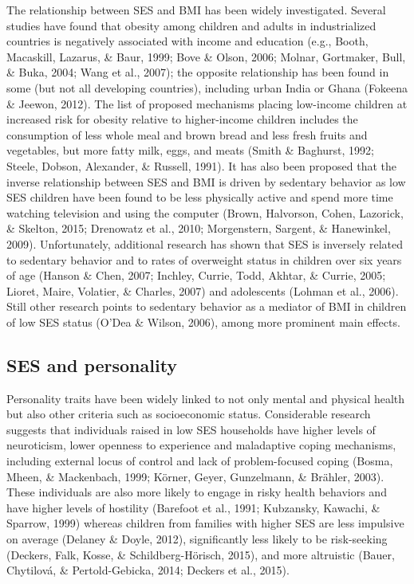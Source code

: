 \documentclass[man]{apa6}
\begin{document}
The relationship between SES and BMI has been widely investigated. Several studies have found that obesity among children and adults in industrialized countries is negatively associated with income and education (e.g., Booth, Macaskill, Lazarus, \& Baur, 1999; Bove \& Olson, 2006; Molnar, Gortmaker, Bull, \& Buka, 2004; Wang et al., 2007); the opposite relationship has been found in some (but not all developing countries), including urban India or Ghana (Fokeena \& Jeewon, 2012). The list of proposed mechanisms placing low-income children at increased risk for obesity relative to higher-income children includes the consumption of less whole meal and brown bread and less fresh fruits and vegetables, but more fatty milk, eggs, and meats (Smith \& Baghurst, 1992; Steele, Dobson, Alexander, \& Russell, 1991). It has also been proposed that the inverse relationship between SES and BMI is driven by sedentary behavior as low SES children have been found to be less physically active and spend more time watching television and using the computer (Brown, Halvorson, Cohen, Lazorick, \& Skelton, 2015; Drenowatz et al., 2010; Morgenstern, Sargent, \& Hanewinkel, 2009). Unfortunately, additional research has shown that SES is inversely related to sedentary behavior and to rates of overweight status in children over six years of age (Hanson \& Chen, 2007; Inchley, Currie, Todd, Akhtar, \& Currie, 2005; Lioret, Maire, Volatier, \& Charles, 2007) and adolescents (Lohman et al., 2006). Still other research points to sedentary behavior as a mediator of BMI in children of low SES status (O'Dea \& Wilson, 2006), among more prominent main effects.

\hypertarget{ses-and-personality}{%
\subsection{SES and personality}\label{ses-and-personality}}

Personality traits have been widely linked to not only mental and physical health but also other criteria such as socioeconomic status. Considerable research suggests that individuals raised in low SES households have higher levels of neuroticism, lower openness to experience and maladaptive coping mechanisms, including external locus of control and lack of problem-focused coping (Bosma, Mheen, \& Mackenbach, 1999; Körner, Geyer, Gunzelmann, \& Brähler, 2003). These individuals are also more likely to engage in risky health behaviors and have higher levels of hostility (Barefoot et al., 1991; Kubzansky, Kawachi, \& Sparrow, 1999) whereas children from families with higher SES are less impulsive on average (Delaney \& Doyle, 2012), significantly less likely to be risk-seeking (Deckers, Falk, Kosse, \& Schildberg-Hörisch, 2015), and more altruistic (Bauer, Chytilová, \& Pertold-Gebicka, 2014; Deckers et al., 2015).
\end{document}
